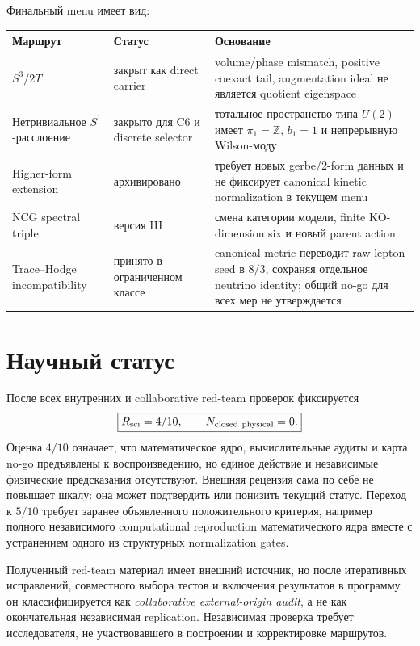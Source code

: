 Финальный menu имеет вид:
\begin{center}
\small
\begin{tabular}{>{\raggedright\arraybackslash}p{}
                >{\raggedright\arraybackslash}p{}
                >{\raggedright\arraybackslash}p{}}
\toprule
Маршрут & Статус & Основание \\
\midrule
\(S^3/2T\) & закрыт как direct carrier & volume/phase mismatch,
positive coexact tail, augmentation ideal не является quotient eigenspace \\
Нетривиальное \(S^1\)-расслоение & закрыто для C6 и discrete selector &
тотальное пространство типа \(U(2)\) имеет \(\pi_1=\mathbb Z\), \(b_1=1\)
и непрерывную Wilson-моду \\
Higher-form extension & архивировано & требует новых gerbe/2-form данных и
не фиксирует canonical kinetic normalization в текущем menu \\
NCG spectral triple & версия III & смена категории модели, finite
KO-dimension six и новый parent action \\
Trace--Hodge incompatibility & принято в ограниченном классе & canonical
metric переводит raw lepton seed в \(8/3\), сохраняя отдельное neutrino
identity; общий no-go для всех мер не утверждается \\
\bottomrule
\end{tabular}
\end{center}

\section{Научный статус}

После всех внутренних и collaborative red-team проверок фиксируется
\begin{equation}
 \boxed{
 R_{\rm sci}=4/10,
 \qquad
 N_{\rm closed\ physical}=0.}
\end{equation}
Оценка \(4/10\) означает, что математическое ядро, вычислительные аудиты и
карта no-go предъявлены к воспроизведению, но единое действие и независимые
физические предсказания отсутствуют. Внешняя рецензия сама по себе не
повышает шкалу: она может подтвердить или понизить текущий статус. Переход к
\(5/10\) требует заранее объявленного положительного критерия, например
полного независимого computational reproduction математического ядра вместе
с устранением одного из структурных normalization gates.

Полученный red-team материал имеет внешний источник, но после итеративных
исправлений, совместного выбора тестов и включения результатов в программу
он классифицируется как \emph{collaborative external-origin audit}, а не как
окончательная независимая replication. Независимая проверка требует
исследователя, не участвовавшего в построении и корректировке маршрутов.

